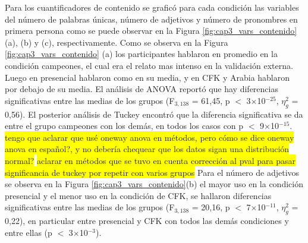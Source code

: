 Para los cuantificadores de contenido se graficó para cada condición las variables del número de palabras únicas, número de adjetivos y número de pronombres en primera persona como se puede observar en la Figura \ref{fig:cap3_vars_contenido} (a), (b) y (c), respectivamente. Como se observa en la  Figura \ref{fig:cap3_vars_contenido} (a) los participantes hablaron en promedio en la condición campeones, el cual era el relato mas intenso en la validación externa. Luego en presencial hablaron como en su media, y en CFK y Arabia hablaron por debajo de su media. El análisis de ANOVA reportó que hay diferencias significativas entre las medias de los grupos (F$_{3, 138}$ = 61,45, p $<$ 3$\times$10$^{-25}$, $\eta_g^2$ = 0,56). El posterior análisis de Tuckey encontró que la diferencia significativa se da entre el grupo campeones con los demás, en todos los casos con p $<$ 9$\times$10$^{-15}$. \colorbox{yellow}{tengo que aclarar que usé oneway anova en métodos, pero cómo se dice oneway anova en español?, y no debería chequear que los datos sigan una distribución normal?} 
\colorbox{yellow}{aclarar en métodos que se tuvo en cuenta corrección al pval para pasar significancia de tuckey por repetir con varios grupos}
Para el número de adjetivos se observa en la Figura \ref{fig:cap3_vars_contenido}(b) el mayor uso en la condición presencial y el menor uso en la condición de CFK, se hallaron diferencias significativas entre las medias de los grupos (F$_{3, 138}$ = 20,16, p $<$ 7$\times$10$^{-11}$, $\eta_g^2$ = 0,22), en particular entre presencial y CFK con todos las demás condiciones y entre ellas (p $<$ 3$\times$10$^{-3}$). 
